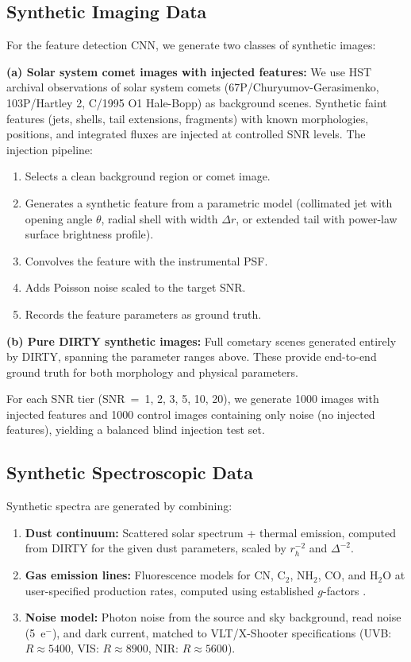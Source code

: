 \documentclass[preprint2]{aastex631}
\begin{document}
\subsection{Synthetic Imaging Data}

For the feature detection CNN, we generate two classes of synthetic images:

\textbf{(a) Solar system comet images with injected features:} We use HST archival observations of solar system comets (67P/Churyumov-Gerasimenko, 103P/Hartley 2, C/1995 O1 Hale-Bopp) as background scenes. Synthetic faint features (jets, shells, tail extensions, fragments) with known morphologies, positions, and integrated fluxes are injected at controlled SNR levels. The injection pipeline:
\begin{enumerate}
    \item Selects a clean background region or comet image.
    \item Generates a synthetic feature from a parametric model (collimated jet with opening angle $\theta$, radial shell with width $\Delta r$, or extended tail with power-law surface brightness profile).
    \item Convolves the feature with the instrumental PSF.
    \item Adds Poisson noise scaled to the target SNR.
    \item Records the feature parameters as ground truth.
\end{enumerate}

\textbf{(b) Pure DIRTY synthetic images:} Full cometary scenes generated entirely by DIRTY, spanning the parameter ranges above. These provide end-to-end ground truth for both morphology and physical parameters.

For each SNR tier (SNR~=~1, 2, 3, 5, 10, 20), we generate 1000 images with injected features and 1000 control images containing only noise (no injected features), yielding a balanced blind injection test set.

\subsection{Synthetic Spectroscopic Data}

Synthetic spectra are generated by combining:
\begin{enumerate}
    \item \textbf{Dust continuum:} Scattered solar spectrum + thermal emission, computed from DIRTY for the given dust parameters, scaled by $r_h^{-2}$ and $\Delta^{-2}$.
    \item \textbf{Gas emission lines:} Fluorescence models for CN, C$_2$, NH$_2$, CO, and H$_2$O at user-specified production rates, computed using established $g$-factors \citep{ahearn95}.
    \item \textbf{Noise model:} Photon noise from the source and sky background, read noise (5~e$^-$), and dark current, matched to VLT/X-Shooter specifications (UVB: $R \approx 5400$, VIS: $R \approx 8900$, NIR: $R \approx 5600$).
\end{enumerate}
\end{document}
